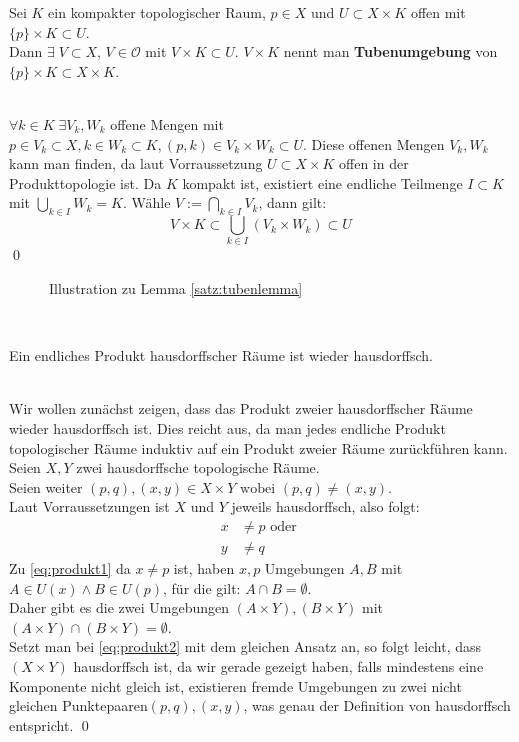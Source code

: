 \begin{Lemma}[Tubenlemma]\label{satz:tubenlemma}
	Sei \(K \) ein kompakter topologischer Raum,  \(p \in X \) und \( U \subset X \times K \) offen mit \( \{p\} \times K \subset U \). \\
	Dann \( \exists \; V \subset X \), \( V \in \mathcal{O} \) mit \( V \times K \subset U \). \( V \times K \) nennt man \textbf{Tubenumgebung} von 
	\( \{p\} \times K \subset X \times K \).
\end{Lemma} 
%
	\\
	\( \forall k \in K \; \exists V_{k}, W_{k}\) offene Mengen mit \( p \in V_{k} \subset X, k \in W_{k} \subset K, (p,k) \in  V_{k} \times W_{k} \subset U\).
	Diese offenen Mengen \(V_{k}, W_{k}\) kann man finden, da laut Vorraussetzung \(U  \subset X \times K \) offen in der Produkttopologie ist.
	Da \(K \) kompakt ist, existiert eine endliche Teilmenge
	\( I \subset K \) mit \( \bigcup_{ k \in I } W_{k} = K \). Wähle \(V := \bigcap_{ k \in I } V_{k} \), dann gilt:
	\[ V \times K \subset \bigcup_{k \in I} (V_{k} \times W_{k}) \subset U \] \qed \newpage	
%
\begin{figure}[ht]
	\centering
	\def\svgwidth{200}
	
	\label{fig:tubenlemma}
	\caption{Illustration zu Lemma \ref{satz:tubenlemma}}
\end{figure}\\
%
\begin{Satz}
	Ein endliches Produkt hausdorffscher Räume ist wieder hausdorffsch.
\end{Satz}
%
	\\
	Wir wollen zunächst zeigen, dass das Produkt zweier hausdorffscher Räume wieder hausdorffsch ist. Dies reicht aus, da man jedes endliche Produkt topologischer Räume
	induktiv auf ein Produkt zweier Räume zurückführen kann. \\
	Seien \(X, Y\) zwei hausdorffsche topologische Räume.\\
	Seien weiter \( (p,q), (x,y) \in X \times Y \mbox{ wobei } (p,q) \ne (x,y) \). \\
	Laut Vorraussetzungen ist \(X\) und \(Y\) jeweils hausdorffsch, also folgt: 
	\begin{align}
		x &\ne p \mbox{ oder }\label{eq:produkt1}\\ 
		y &\ne q\label{eq:produkt2} 
	\end{align}
	Zu \eqref{eq:produkt1} da \(x \ne p \) ist, haben \(x, p \) Umgebungen \(A, B \) mit \( A \in U(x)  \land B \in U(p) \), für die gilt: \(A \cap B = \emptyset \).\\ Daher gibt es die
	zwei Umgebungen \( (A \times Y), (B \times Y) \) mit \( (A \times Y) \cap (B \times Y) = \emptyset \). \\
	Setzt man bei \eqref{eq:produkt2} mit dem gleichen Ansatz an, so folgt leicht, dass \( (X \times Y) \) hausdorffsch ist, da wir gerade gezeigt haben, falls mindestens eine Komponente
	nicht gleich ist, existieren fremde Umgebungen zu zwei nicht gleichen Punktepaaren\( (p,q), (x,y) \), was genau der Definition von hausdorffsch entspricht.
\qed

